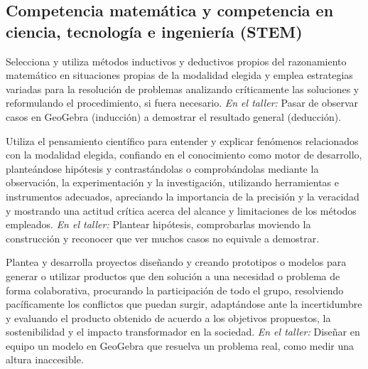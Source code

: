 \documentclass[11pt,a4paper]{article}
\begin{document}
\subsection*{Competencia matemática y competencia en ciencia, tecnología e ingeniería (STEM)}
\begin{description}[leftmargin=0pt, style=nextline]
  \item[\color{acento}STEM1] Selecciona y utiliza métodos inductivos y deductivos propios del razonamiento matemático en situaciones propias de la modalidad elegida y emplea estrategias variadas para la resolución de problemas analizando críticamente las soluciones y reformulando el procedimiento, si fuera necesario.\newline
    {\color{gris}\textit{En el taller:} Pasar de observar casos en GeoGebra (inducción) a demostrar el resultado general (deducción).}
  \item[\color{acento}STEM2] Utiliza el pensamiento científico para entender y explicar fenómenos relacionados con la modalidad elegida, confiando en el conocimiento como motor de desarrollo, planteándose hipótesis y contrastándolas o comprobándolas mediante la observación, la experimentación y la investigación, utilizando herramientas e instrumentos adecuados, apreciando la importancia de la precisión y la veracidad y mostrando una actitud crítica acerca del alcance y limitaciones de los métodos empleados.\newline
    {\color{gris}\textit{En el taller:} Plantear hipótesis, comprobarlas moviendo la construcción y reconocer que ver muchos casos no equivale a demostrar.}
  \item[\color{acento}STEM3] Plantea y desarrolla proyectos diseñando y creando prototipos o modelos para generar o utilizar productos que den solución a una necesidad o problema de forma colaborativa, procurando la participación de todo el grupo, resolviendo pacíficamente los conflictos que puedan surgir, adaptándose ante la incertidumbre y evaluando el producto obtenido de acuerdo a los objetivos propuestos, la sostenibilidad y el impacto transformador en la sociedad.\newline
    {\color{gris}\textit{En el taller:} Diseñar en equipo un modelo en GeoGebra que resuelva un problema real, como medir una altura inaccesible.}
\end{description}
\end{document}
